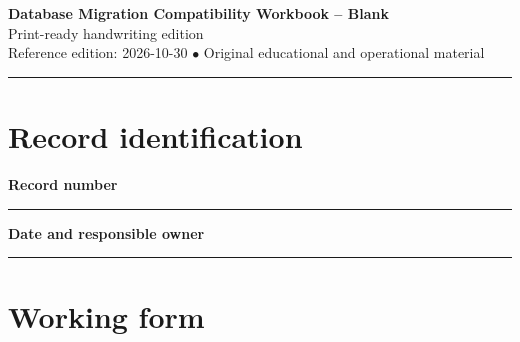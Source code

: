 \documentclass[10pt,letterpaper]{article}
\begin{document}
\begin{center}
{\LARGE\bfseries\color{cdblue}Database Migration Compatibility Workbook -- Blank}\\[7pt]
{\large Print-ready handwriting edition}\\[6pt]
{\small Reference edition: 2026-10-30 $\bullet$ Original educational and operational material}
\end{center}
\noindent\color{cdblue}\rule{\linewidth}{1.2pt}\color{black}
\vspace{0.4em}
\section{Record identification}
\textbf{Record number}\par
\noindent\rule{\linewidth}{0.35pt}\par\vspace{0.7em}
\textbf{Date and responsible owner}\par
\noindent\rule{\linewidth}{0.35pt}\par\vspace{0.7em}

\section{Working form}
\end{document}
